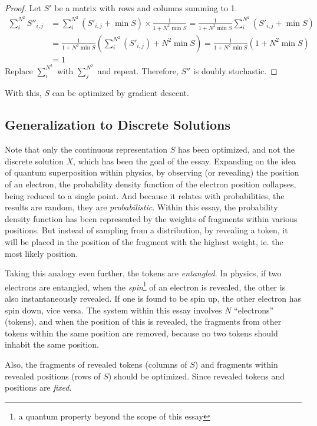 \begin{proof}
    Let $S'$ be a matrix with rows and columns summing to 1.
    \begin{align*}
        \sum_i^{N^2} S''_{i,j}&=\sum_i^{N^2} (S'_{i,j}+\min{S})\times \frac{1}{1+N^2 \min{S}}=\frac{1}{1+N^2 \min{S}} \sum_i^{N^2} (S'_{i,j}+\min{S})\\
                             &=\frac{1}{1+N^2 \min{S}} (\sum_i^{N^2} (S'_{i,j})+N^2\min{S})=\frac{1}{1+N^2 \min{S}} (1+N^2\min{S})\\
                       &=1
    \end{align*} Replace $\sum_i^{N^2}$ with $\sum_j^{N^2}$ and repeat. Therefore, $S''$ is doubly stochastic.
\end{proof}

With this, $S$ can be optimized by gradient descent.

\subsection{Generalization to Discrete Solutions}%
\label{sub:generalization_to_discrete_solutions}
Note that only the continuous representation $S$ has been optimized, and not the discrete solution $X$, which has been the goal of the essay. Expanding on the idea of quantum superposition within physics, by observing (or revealing) the position of an electron, the probability density function of the electron position collapses, being reduced to a single point. And because it relates with probabilities, the results are random, they are \emph{probabilistic}. Within this essay, the probability density function has been represented by the weights of fragments within various positions. But instead of sampling from a distribution, by revealing a token, it will be placed in the position of the fragment with the highest weight, ie. the most likely position.

Taking this analogy even further, the tokens are \emph{entangled}. In physics, if two electrons are entangled, when the \emph{spin}\footnote{a quantum property beyond the scope of this essay} of an electron is revealed, the other is also instantaneously revealed. If one is found to be spin up, the other electron has spin down, vice versa. The system within this essay involves $N$  ``electrons'' (tokens), and when the position of this is revealed, the fragments from other tokens within the same position are removed, because no two tokens should inhabit the same position.

Also, the fragments of revealed tokens (columns of $S$) and fragments within revealed positions (rows of $S$) should be optimized. Since revealed tokens and positions are \emph{fixed}.


